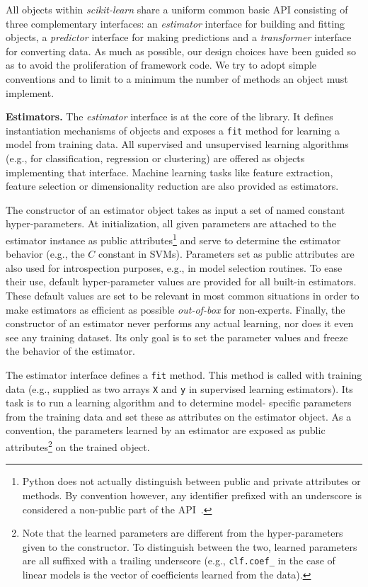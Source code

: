 \documentclass{llncs}
\begin{document}
All objects within \textit{scikit-learn} share a uniform common basic API
consisting of three complementary interfaces: an \textit{estimator} interface
for building and fitting objects, a \textit{predictor} interface for making
predictions and a \textit{transformer} interface for converting data.
As much as possible, our design choices have been guided so as to avoid
the proliferation of framework code. We try to adopt simple conventions and
to limit to a minimum the number of methods an object must implement.

\textbf{Estimators.} The \textit{estimator} interface is at the core of the
library. It defines instantiation mechanisms of objects and exposes a
\texttt{fit} method for learning a model from training data.  All supervised and
unsupervised learning algorithms (e.g., for classification, regression or
clustering) are offered as objects implementing that interface. Machine
learning tasks like feature extraction, feature selection or dimensionality
reduction are also provided as estimators.

The constructor of an estimator object takes as input a set of named constant
hyper-parameters. At initialization, all given parameters are attached to the
estimator instance as public attributes\footnote{Python does not actually
distinguish between public and private  attributes or methods. By convention
however, any identifier prefixed with an underscore is considered a non-public
part of the API~\citep{pythontut}.} and serve to determine the estimator
behavior (e.g., the $C$ constant in SVMs). Parameters set as public attributes
are also used for introspection purposes, e.g., in model selection routines. To
ease their use, default hyper-parameter values are provided for all
built-in estimators. These default values are set to be relevant in most common
situations in order to make estimators as efficient as possible \textit{out-of-box}
for non-experts. Finally, the constructor of an estimator never performs
any actual learning, nor does it even see any training dataset. Its only goal is
to set the parameter values and freeze the behavior of the estimator.

The estimator interface defines a \texttt{fit} method. This method is
called with training data (e.g., supplied as two arrays
\texttt{X} and \texttt{y} in supervised learning estimators). Its task
is to run a learning algorithm and to determine model-
specific parameters from the training data and set these as attributes on the
estimator object. As a convention, the parameters learned by an estimator are
exposed as public attributes\footnote{Note that the learned parameters are
different from the hyper-parameters given to the constructor. To distinguish
between the two, learned parameters are all suffixed with a trailing underscore
(e.g., \texttt{clf.coef\_} in the case of linear models is the vector of
coefficients learned from the data).} on the trained object.
\end{document}
